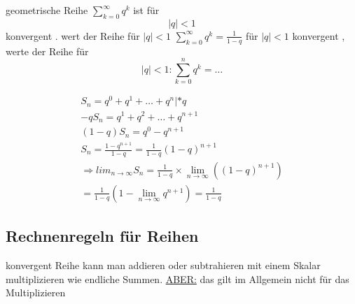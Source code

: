 \begin{example}
geometrische Reihe $ \sum_{k=0}^{\infty} {q^k} $
ist für $$ {|q|} < 1 $$ konvergent . wert der Reihe für $ {|q|} < 1 $  $\sum_{k=0}^{\infty} {q^k}= \frac{1}{1-q} $ für 
$ {|q|} < 1 $  konvergent , werte der Reihe für 
$$ {|q|} <1 : \sum_{k=0}^n{q^k}= \dots $$

\begin{gather*}
S_n = q^0 + q^1 + \dots + q^n | *q \\
-q S_n = q^1 + q^2 + \dots + q^{n+1} \\
(1-q)S_n=q^0 - q^{n+1} \\
S_n = \frac{1-q^{n+1}}{1-q} = \frac{1}{1-q}(1-q)^{n+1}\\
\Rightarrow lim_{n \to \infty}{S_n} = \frac{1}{1-q} \times 
\lim_{n \to \infty}{((1-q)^{n+1})}\\
=\frac{1}{1-q}(1- \lim_{n \to \infty}{q^{n+1}})=\frac{1}{1-q}
\end{gather*}

\subsection{Rechnenregeln für Reihen}
konvergent Reihe kann man addieren oder subtrahieren mit einem Skalar multiplizieren
wie endliche Summen.
\underline{ABER:}
 das gilt im Allgemein nicht für das Multiplizieren  


\end{example}
